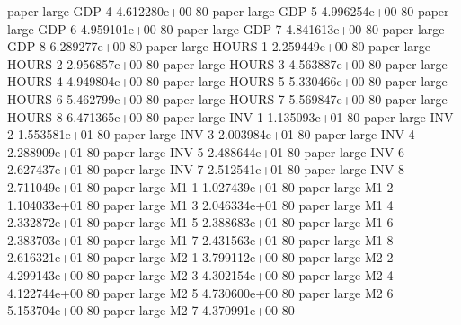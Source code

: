               paper      large      GDP                 4 4.612280e+00 80
              paper      large      GDP                 5 4.996254e+00 80
              paper      large      GDP                 6 4.959101e+00 80
              paper      large      GDP                 7 4.841613e+00 80
              paper      large      GDP                 8 6.289277e+00 80
              paper      large    HOURS                 1 2.259449e+00 80
              paper      large    HOURS                 2 2.956857e+00 80
              paper      large    HOURS                 3 4.563887e+00 80
              paper      large    HOURS                 4 4.949804e+00 80
              paper      large    HOURS                 5 5.330466e+00 80
              paper      large    HOURS                 6 5.462799e+00 80
              paper      large    HOURS                 7 5.569847e+00 80
              paper      large    HOURS                 8 6.471365e+00 80
              paper      large      INV                 1 1.135093e+01 80
              paper      large      INV                 2 1.553581e+01 80
              paper      large      INV                 3 2.003984e+01 80
              paper      large      INV                 4 2.288909e+01 80
              paper      large      INV                 5 2.488644e+01 80
              paper      large      INV                 6 2.627437e+01 80
              paper      large      INV                 7 2.512541e+01 80
              paper      large      INV                 8 2.711049e+01 80
              paper      large       M1                 1 1.027439e+01 80
              paper      large       M1                 2 1.104033e+01 80
              paper      large       M1                 3 2.046334e+01 80
              paper      large       M1                 4 2.332872e+01 80
              paper      large       M1                 5 2.388683e+01 80
              paper      large       M1                 6 2.383703e+01 80
              paper      large       M1                 7 2.431563e+01 80
              paper      large       M1                 8 2.616321e+01 80
              paper      large       M2                 1 3.799112e+00 80
              paper      large       M2                 2 4.299143e+00 80
              paper      large       M2                 3 4.302154e+00 80
              paper      large       M2                 4 4.122744e+00 80
              paper      large       M2                 5 4.730600e+00 80
              paper      large       M2                 6 5.153704e+00 80
              paper      large       M2                 7 4.370991e+00 80
